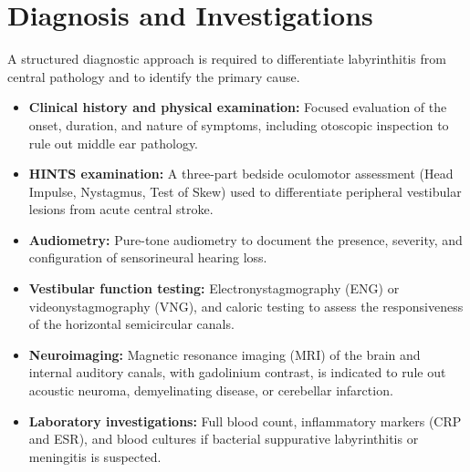 \section*{Diagnosis and Investigations}
A structured diagnostic approach is required to differentiate labyrinthitis from central pathology and to identify the primary cause.
\begin{itemize}
    \item \textbf{Clinical history and physical examination:} Focused evaluation of the onset, duration, and nature of symptoms, including otoscopic inspection to rule out middle ear pathology.
    \item \textbf{HINTS examination:} A three-part bedside oculomotor assessment (Head Impulse, Nystagmus, Test of Skew) used to differentiate peripheral vestibular lesions from acute central stroke.
    \item \textbf{Audiometry:} Pure-tone audiometry to document the presence, severity, and configuration of sensorineural hearing loss.
    \item \textbf{Vestibular function testing:} Electronystagmography (ENG) or videonystagmography (VNG), and caloric testing to assess the responsiveness of the horizontal semicircular canals.
    \item \textbf{Neuroimaging:} Magnetic resonance imaging (MRI) of the brain and internal auditory canals, with gadolinium contrast, is indicated to rule out acoustic neuroma, demyelinating disease, or cerebellar infarction.
    \item \textbf{Laboratory investigations:} Full blood count, inflammatory markers (CRP and ESR), and blood cultures if bacterial suppurative labyrinthitis or meningitis is suspected.
\end{itemize}

